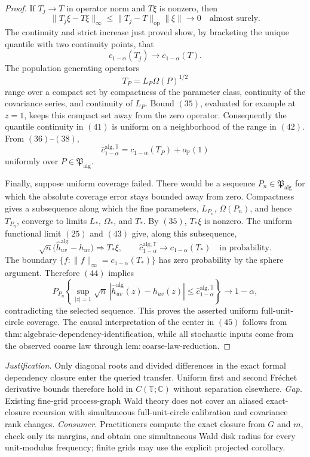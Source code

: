\documentclass{article}
\begin{document}
\begin{proof}
If \(T_j\to T\) in operator norm and \(T\xi\) is nonzero, then
\[
 \|T_j\xi-T\xi\|_\infty
 \le\|T_j-T\|_{\mathrm{op}}\|\xi\|\longrightarrow0
 \quad\text{almost surely}.
\tag{40}
\]
The continuity and strict increase just proved show, by bracketing the unique quantile with two continuity points, that
\[
 c_{1-\alpha}(T_j)\longrightarrow c_{1-\alpha}(T).
\tag{41}
\]
The population generating operators
\[
 T_P=L_P\Omega(P)^{1/2}
\tag{42}
\]
range over a compact set by compactness of the parameter class, continuity of the covariance series, and continuity of \(L_P\).  Bound \((35)\), evaluated for example at \(z=1\), keeps this compact set away from the zero operator.  Consequently the quantile continuity in \((41)\) is uniform on a neighborhood of the range in \((42)\).  From \((36)\)--\((38)\),
\[
 \widehat c_{1-\alpha}^{\mathrm{alg},\mathbb T}
 =c_{1-\alpha}(T_P)+o_{\mathbb P}(1)
\tag{43}
\]
uniformly over \(P\in\mathfrak P_{\mathrm{alg}}\).

Finally, suppose uniform coverage failed.  There would be a sequence \(P_n\in\mathfrak P_{\mathrm{alg}}\) for which the absolute coverage error stays bounded away from zero.  Compactness gives a subsequence along which the fine parameters, \(L_{P_n}\), \(\Omega(P_n)\), and hence \(T_{P_n}\), converge to limits \(L_*\), \(\Omega_*\), and \(T_*\).  By \((35)\), \(T_*\xi\) is nonzero.  The uniform functional limit \((25)\) and \((43)\) give, along this subsequence,
\[
 \sqrt n\bigl(\widehat h_{uv}^{\mathrm{alg}}-h_{uv}\bigr)
 \Longrightarrow T_*\xi,
 \qquad
 \widehat c_{1-\alpha}^{\mathrm{alg},\mathbb T}
 \longrightarrow c_{1-\alpha}(T_*)
 \quad\text{in probability}.
\tag{44}
\]
The boundary \(\{f:\|f\|_\infty=c_{1-\alpha}(T_*)\}\) has zero probability by the sphere argument.  Therefore \((44)\) implies
\[
 P_{P_n}\!\left\{
  \sup_{|z|=1}\sqrt n\,
  |\widehat h_{uv}^{\mathrm{alg}}(z)-h_{uv}(z)|
  \le\widehat c_{1-\alpha}^{\mathrm{alg},\mathbb T}
 \right\}\longrightarrow1-\alpha,
\tag{45}
\]
contradicting the selected sequence.  This proves the asserted uniform full-unit-circle coverage.  The causal interpretation of the center in \((45)\) follows from \(\mathrm{thm{:}algebraic\mbox{-}dependency\mbox{-}identification}\), while all stochastic inputs come from the observed coarse law through \(\mathrm{lem{:}coarse\mbox{-}law\mbox{-}reduction}\).
\end{proof}
\par\smallskip\noindent \textit{Justification.} Only diagonal roots and divided differences in the exact formal dependency closure enter the queried transfer.  Uniform first and second Fr\'echet derivative bounds therefore hold in \(C(\mathbb T;\mathbb C)\) without separation elsewhere. \textit{Gap.} Existing fine-grid process-graph Wald theory does not cover an aliased exact-closure recursion with simultaneous full-unit-circle calibration and covariance rank changes. \textit{Consumer.} Practitioners compute the exact closure from \(G\) and \(m\), check only its margins, and obtain one simultaneous Wald disk radius for every unit-modulus frequency; finite grids may use the explicit projected corollary.
\end{document}
